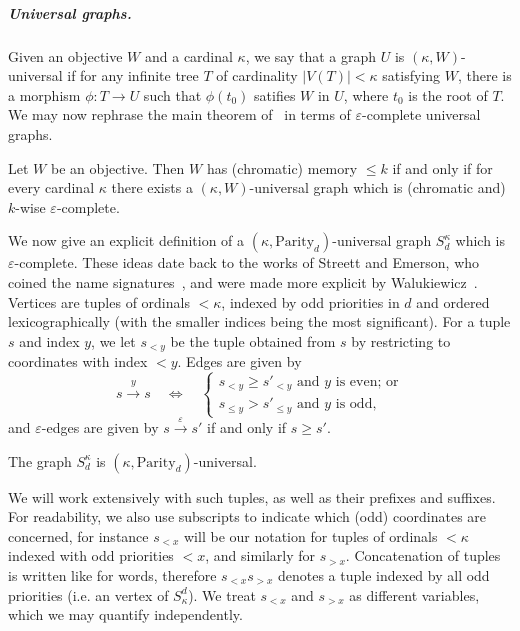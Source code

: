 \documentclass[a4paper,UKenglish,cleveref, thm-restate]{lipics-v2021}
\newcommand{\re}[1]{\xrightarrow{#1}}
\newcommand{\Parity}{\mathrm{Parity}}
\newcommand{\eps}{\varepsilon}
\begin{document}
\subparagraph*{Universal graphs.}
Given an objective $W$ and a cardinal $\kappa$, we say that a graph $U$ is $(\kappa,W)$-universal if for any infinite tree $T$ of cardinality $|V(T)|<\kappa$ satisfying $W$, there is a morphism $\phi:T \to U$ such that $\phi(t_0)$ satifies $W$ in $U$, where $t_0$ is the root of $T$.
We may now rephrase the main theorem of~\cite{CO25LMCS} in terms of $\eps$-complete universal graphs.

\begin{theorem}\label{thm:universal_graphs}
Let $W$ be an objective.
Then $W$ has (chromatic) memory $\leq k$ if and only if for every cardinal $\kappa$ there exists a $(\kappa,W)$-universal graph which is (chromatic and) $k$-wise $\eps$-complete.
\end{theorem}


We now give an explicit definition of a $(\kappa,\Parity_{d})$-universal graph $S^\kappa_{d}$ which is $\eps$-complete.
These ideas date back to the works of Streett and Emerson, who coined the name signatures~\cite{SE89}, and were made more explicit by Walukiewicz~\cite{Walukiewicz96}. 
Vertices are tuples of ordinals $<\kappa$, indexed by odd priorities in $d$ and ordered lexicographically (with the smaller indices being the most significant).
For a tuple $s$ and index $y$, we let $s_{< y}$ be the tuple obtained from $s$ by restricting to coordinates with index $< y$. Edges are given by
\[
    s \re y s \quad \iff \quad \begin{cases}
        s_{< y} \geq s'_{< y} \text{ and $y$ is even; or}\\
        s_{\leq y} > s'_{\leq y} \text{ and $y$ is odd,}
    \end{cases}
\]
and $\eps$-edges are given by $s \re{\eps} s'$ if and only if $s \geq s'$.

\begin{lemma}
The graph $S^\kappa_d$ is $(\kappa,\Parity_d)$-universal.
\end{lemma}

We will work extensively with such tuples, as well as their prefixes and suffixes.
For readability, we also use subscripts to indicate which (odd) coordinates are concerned, for instance $s_{<x}$ will be our notation for tuples of ordinals $< \kappa$ indexed with odd priorities $<x$, and similarly for $s_{>x}$.
Concatenation of tuples is written like for words, therefore $s_{<x} s_{>x}$ denotes a tuple indexed by all odd priorities (i.e. an vertex of $S_\kappa^d$).
We treat $s_{<x}$ and $s_{>x}$ as different variables, which we may quantify independently.
 
\end{document}
